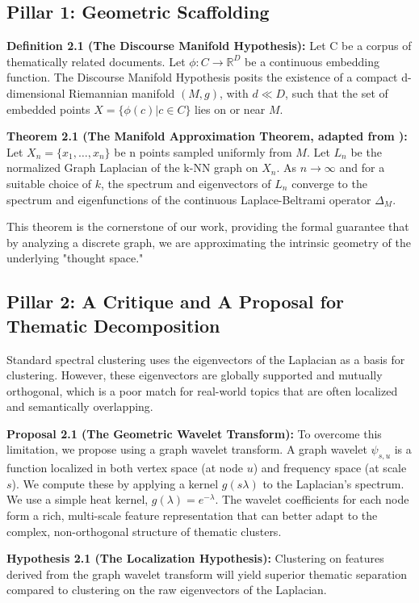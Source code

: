 \documentclass[11pt, letterpaper]{article}
\begin{document}
\subsection{Pillar 1: Geometric Scaffolding}
\textbf{Definition 2.1 (The Discourse Manifold Hypothesis):} Let C be a corpus of thematically related documents. Let $\phi: C \to \mathbb{R}^D$ be a continuous embedding function. The Discourse Manifold Hypothesis posits the existence of a compact d-dimensional Riemannian manifold $(M, g)$, with $d \ll D$, such that the set of embedded points $X = \{\phi(c) | c \in C\}$ lies on or near $M$.

\textbf{Theorem 2.1 (The Manifold Approximation Theorem, adapted from \cite{belkin2003laplacian}):} Let $X_n = \{x_1, \dots, x_n\}$ be n points sampled uniformly from $M$. Let $L_n$ be the normalized Graph Laplacian of the k-NN graph on $X_n$. As $n \to \infty$ and for a suitable choice of $k$, the spectrum and eigenvectors of $L_n$ converge to the spectrum and eigenfunctions of the continuous Laplace-Beltrami operator $\Delta_M$.

This theorem is the cornerstone of our work, providing the formal guarantee that by analyzing a discrete graph, we are approximating the intrinsic geometry of the underlying "thought space."

\subsection{Pillar 2: A Critique and A Proposal for Thematic Decomposition}
Standard spectral clustering uses the eigenvectors of the Laplacian as a basis for clustering. However, these eigenvectors are globally supported and mutually orthogonal, which is a poor match for real-world topics that are often localized and semantically overlapping.

\textbf{Proposal 2.1 (The Geometric Wavelet Transform):} To overcome this limitation, we propose using a graph wavelet transform. A graph wavelet $\psi_{s,u}$ is a function localized in both vertex space (at node $u$) and frequency space (at scale $s$). We compute these by applying a kernel $g(s\lambda)$ to the Laplacian's spectrum. We use a simple heat kernel, $g(\lambda) = e^{-\lambda}$. The wavelet coefficients for each node form a rich, multi-scale feature representation that can better adapt to the complex, non-orthogonal structure of thematic clusters.

\textbf{Hypothesis 2.1 (The Localization Hypothesis):} Clustering on features derived from the graph wavelet transform will yield superior thematic separation compared to clustering on the raw eigenvectors of the Laplacian.
\end{document}
